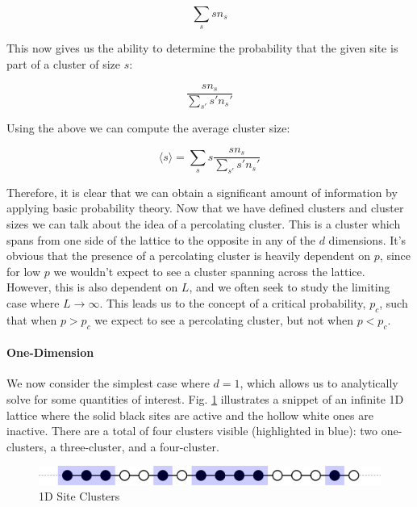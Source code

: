 \begin{equation}
	\label{eqn:p_in_cluster}
	\sum_s s n_s
\end{equation}

This now gives us the ability to determine the probability that the given site is part of a cluster of size $s$:

\begin{equation}
	\label{eqn:p_in_cluster_size_s}
	\frac{s n_s}{\sum_{s'} s' n_s'}
\end{equation}

Using the above we can compute the average cluster size:

\begin{equation}
	\label{eqn:avg_cluster_size}
	\langle s \rangle = \sum_s s \frac{s n_s}{\sum_{s'} s' n_s'}
\end{equation}

Therefore, it is clear that we can obtain a significant amount of information by applying basic probability theory.
Now that we have defined clusters and cluster sizes we can talk about the idea of a percolating cluster.
This is a cluster which spans from one side of the lattice to the opposite in any of the $d$ dimensions.
It's obvious that the presence of a percolating cluster is heavily dependent on $p$, since for low $p$ we wouldn't expect to see a cluster spanning across the lattice.
However, this is also dependent on $L$, and we often seek to study the limiting case where $L \rightarrow \infty$.
This leads us to the concept of a critical probability, $p_c$, such that when $p > p_c$ we expect to see a percolating cluster, but not when $p < p_c$.

\paragraph{One-Dimension}
We now consider the simplest case where $d = 1$, which allows us to analytically solve for some quantities of interest.
Fig. \ref{fig:1d_site_clusters} illustrates a snippet of an infinite 1D lattice where the solid black sites are active and the hollow white ones are inactive.
There are a total of four clusters visible (highlighted in blue): two one-clusters, a three-cluster, and a four-cluster.

\begin{figure}[H]
	\centering
	\includegraphics[width=350pt]{images/1d_site_clusters.png}
	\caption{1D Site Clusters}
	\label{fig:1d_site_clusters}
\end{figure}

